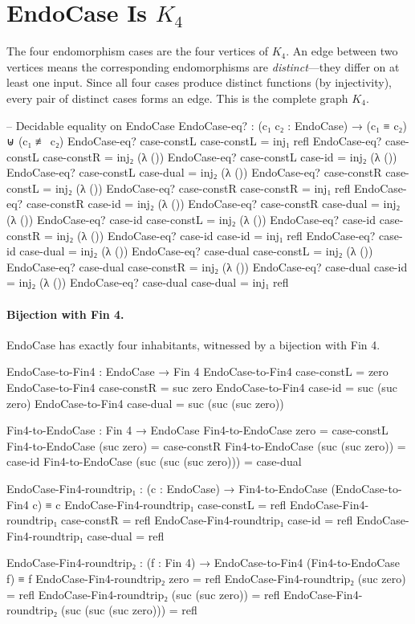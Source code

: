 \documentclass[11pt,a4paper]{book}
\def\texttt#1{#1}%
\begin{document}
\section[EndoCase Is K4]{EndoCase Is $K_4$}
\label{sec:endocase-is-k4}

The four endomorphism cases are the four vertices of $K_4$. An edge between two
vertices means the corresponding endomorphisms are \emph{distinct}---they differ on
at least one input. Since all four cases produce distinct functions (by injectivity),
every pair of distinct cases forms an edge. This is the complete graph $K_4$.

\begin{code}
-- Decidable equality on EndoCase
EndoCase-eq? : (c₁ c₂ : EndoCase) → (c₁ ≡ c₂) ⊎ (c₁ ≢ c₂)
EndoCase-eq? case-constL case-constL = inj₁ refl
EndoCase-eq? case-constL case-constR = inj₂ (λ ())
EndoCase-eq? case-constL case-id     = inj₂ (λ ())
EndoCase-eq? case-constL case-dual   = inj₂ (λ ())
EndoCase-eq? case-constR case-constL = inj₂ (λ ())
EndoCase-eq? case-constR case-constR = inj₁ refl
EndoCase-eq? case-constR case-id     = inj₂ (λ ())
EndoCase-eq? case-constR case-dual   = inj₂ (λ ())
EndoCase-eq? case-id     case-constL = inj₂ (λ ())
EndoCase-eq? case-id     case-constR = inj₂ (λ ())
EndoCase-eq? case-id     case-id     = inj₁ refl
EndoCase-eq? case-id     case-dual   = inj₂ (λ ())
EndoCase-eq? case-dual   case-constL = inj₂ (λ ())
EndoCase-eq? case-dual   case-constR = inj₂ (λ ())
EndoCase-eq? case-dual   case-id     = inj₂ (λ ())
EndoCase-eq? case-dual   case-dual   = inj₁ refl
\end{code}

\paragraph{Bijection with Fin 4.}
EndoCase has exactly four inhabitants, witnessed by a bijection with \texttt{Fin 4}.

\begin{code}
EndoCase-to-Fin4 : EndoCase → Fin 4
EndoCase-to-Fin4 case-constL = zero
EndoCase-to-Fin4 case-constR = suc zero
EndoCase-to-Fin4 case-id     = suc (suc zero)
EndoCase-to-Fin4 case-dual   = suc (suc (suc zero))

Fin4-to-EndoCase : Fin 4 → EndoCase
Fin4-to-EndoCase zero                      = case-constL
Fin4-to-EndoCase (suc zero)                = case-constR
Fin4-to-EndoCase (suc (suc zero))          = case-id
Fin4-to-EndoCase (suc (suc (suc zero)))    = case-dual

EndoCase-Fin4-roundtrip₁ : (c : EndoCase) → Fin4-to-EndoCase (EndoCase-to-Fin4 c) ≡ c
EndoCase-Fin4-roundtrip₁ case-constL = refl
EndoCase-Fin4-roundtrip₁ case-constR = refl
EndoCase-Fin4-roundtrip₁ case-id     = refl
EndoCase-Fin4-roundtrip₁ case-dual   = refl

EndoCase-Fin4-roundtrip₂ : (f : Fin 4) → EndoCase-to-Fin4 (Fin4-to-EndoCase f) ≡ f
EndoCase-Fin4-roundtrip₂ zero                      = refl
EndoCase-Fin4-roundtrip₂ (suc zero)                = refl
EndoCase-Fin4-roundtrip₂ (suc (suc zero))          = refl
EndoCase-Fin4-roundtrip₂ (suc (suc (suc zero)))    = refl
\end{code}
\end{document}
